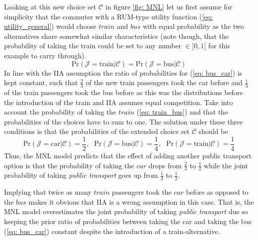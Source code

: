Looking at this new choice set $\mathcal{C}$ in figure \ref{fig: MNL} let us first assume for simplicity that the commuter with a RUM-type utility function (\ref{eq: utility_general}) would choose $train$ and $bus$ with equal probability as the two alternatives share somewhat similar characteristics (note though, that the probability of taking the train could be set to any number $\in]0,1[$ for this example to carry through).
  \begin{equation} \label{eq: train_bus}
    \textrm{Pr}(\mathcal{J}=\textrm{train}|\mathcal{C})
    =\textrm{Pr}(\mathcal{J}=\textrm{bus}|\mathcal{C})
  \end{equation}
In line with the IIA assumption the ratio of probabilities for
(\ref{eq: bus_car}) is kept constant, such that $\frac{2}{3}$ of the new train passengers took the car before and $\frac{1}{3}$ of the train passengers took the bus before as this was the distributions before the introduction of the train and IIA assumes equal competition. Take into account the probability of taking the $train$ (\ref{eq: train_bus}) and that the probabilities of the choices have to sum to one. The solution under these three conditions is that the probabilities of the extended choice set $\mathcal{C}$ should be
  \begin{equation} \label{eq: bus_car_train}
    \textrm{Pr}(\mathcal{J}=\textrm{car}|\mathcal{C})=\frac{1}{2},\ \ \
    \textrm{Pr}(\mathcal{J}=\textrm{bus}|\mathcal{C})=\frac{1}{4},\ \ \
    \textrm{Pr}(\mathcal{J}=\textrm{train}|\mathcal{C})=\frac{1}{4}
  \end{equation}
Thus, the MNL model predicts that the effect of adding another public transport option is that the probability of taking the $car$ drops from $\frac{2}{3}$ to $\frac{1}{2}$ while the joint probability of taking \textit{public transport} goes up from $\frac{1}{3}$ to $\frac{1}{2}$.

Implying that twice as many $train$ passengers took the $car$ before as opposed to the $bus$ makes it obvious that IIA is a wrong assumption in this case. That is, the MNL model overestimates the joint probability of taking \textit{public transport} due so keeping the prior ratio of probabilities between taking the car and taking the bus (\ref{eq: bus_car}) constant despite the introduction of a train-alternative.

